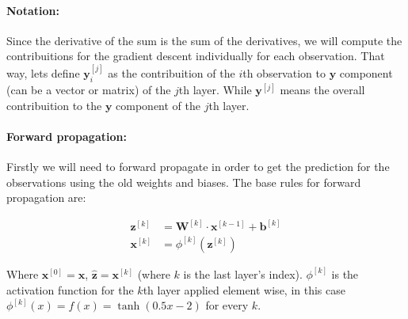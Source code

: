 \documentclass[12pt]{article}
\begin{document}
\begin{enumerate}[leftmargin=\labelsep]
    \paragraph{Notation:} Since the derivative of the sum is the sum of the derivatives, we will compute the contribuitions for the gradient descent individually for each observation. That way, lets define $\mathbf{y}_i^{[j]}$ as the contribuition of the $i$th observation to $\mathbf{y}$ component (can be a vector or matrix) of the $j$th layer. While $\mathbf{y}^{[j]}$ means the overall contribuition to the $\mathbf{y}$ component of the $j$th layer.

    \paragraph{Forward propagation:} Firstly we will need to forward propagate in order to get the prediction for the observations using the old weights and biases.
    The base rules for forward propagation are:

    \begin{equation}
    \begin{split}
        \mathbf{z}^{[k]} &= \mathbf{W}^{[k]} \cdot \mathbf{x}^{[k-1]} + \mathbf{b}^{[k]} \\
        \mathbf{x}^{[k]} &= \phi^{[k]}(\mathbf{z}^{[k]})
    \end{split}
    \end{equation}

    Where $\mathbf{x}^{[0]} = \mathbf{x}$, $\hat{\mathbf{z}} = \mathbf{x}^{[k]}$ (where $k$ is the last layer's index). $\phi^{[k]}$ is the activation function for the $k$th layer applied element wise, in this case $\phi^{[k]}(x) = f(x) =\tanh(0.5x-2)$ for every $k$.


\end{enumerate}
\end{document}
